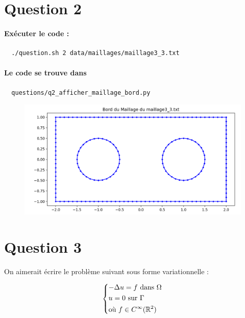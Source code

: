 \documentclass[french, 12pt, a4paper]{article}
\begin{document}

\section*{Question 2}

\paragraph{Exécuter le code :}
\begin{verbatim}
  ./question.sh 2 data/maillages/maillage3_3.txt
\end{verbatim}

\paragraph{Le code se trouve dans}
\begin{verbatim}
  questions/q2_afficher_maillage_bord.py
\end{verbatim}

\begin{figure}[H]
\centering
\includegraphics[scale=0.6]{figure_2.png}
\end{figure}


\section*{Question 3}

On aimerait écrire le problème suivant sous forme variationnelle :

\[
\begin{dcases}
-\Delta u = f \text{ dans } \Omega \\
u = 0 \text{ sur } \Gamma \\
\text{où } f \in C^\infty(\mathbb{R}^2)
\end{dcases}
\]
\end{document}
